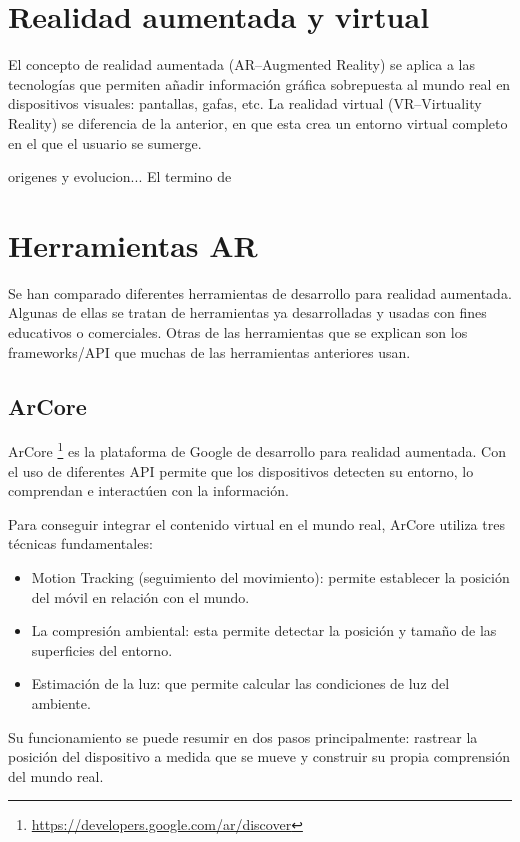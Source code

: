 

\section{Realidad aumentada y virtual}
El concepto de realidad aumentada (AR--Augmented Reality) se aplica a las tecnologías que permiten añadir información gráfica sobrepuesta al mundo real en dispositivos visuales: pantallas, gafas, etc.
La realidad virtual (VR--Virtuality Reality) se diferencia de la anterior, en que esta crea un entorno virtual completo en el que el usuario se sumerge.
 
origenes y evolucion...
El termino de 



\section{Herramientas AR}
Se han comparado diferentes herramientas de desarrollo para realidad aumentada. 
Algunas de ellas se tratan de herramientas ya desarrolladas y usadas con fines educativos o comerciales. Otras de las herramientas que se explican son los frameworks/API que muchas de las herramientas anteriores usan.
 

\subsection{ArCore}
ArCore \footnote{\url{https://developers.google.com/ar/discover}} es la plataforma de Google de desarrollo para realidad aumentada. Con el uso de diferentes API permite que los dispositivos detecten su entorno, lo comprendan e interactúen con la información.

Para conseguir integrar el contenido virtual en el mundo real, ArCore utiliza tres técnicas fundamentales:
\begin{itemize}
	\item Motion Tracking (seguimiento del movimiento): permite establecer la posición del móvil en relación con el mundo.
	\item La compresión ambiental: esta permite detectar la posición y tamaño de las superficies del entorno.
	\item Estimación de la luz: que permite calcular las condiciones de luz del ambiente.
\end{itemize}

Su funcionamiento se puede resumir en dos pasos principalmente: rastrear la posición del dispositivo a medida que se mueve y construir su propia comprensión del mundo real.

